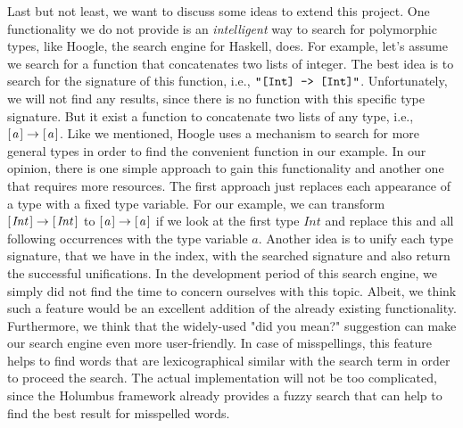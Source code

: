 \documentclass[%
	latex,%
	a4paper,%
	oneside,%
	chapterprefix,%
	headsepline,%
	12pt%
]{scrbook}
\newcommand{\Conid}[1]{\mathit{#1}}
\newcommand{\Varid}[1]{\mathit{#1}}
\begin{document}
Last but not least, we want to discuss some ideas to extend this
project. %
One functionality we do not provide is an \emph{intelligent} way to
search for polymorphic types, like Hoogle, the search engine for
Haskell, does. %
For example, let's assume we search for a function that concatenates
two lists of integer. %
The best idea is to search for the signature of this function, i.e.,
\ensuremath{\text{\tt \char34 [Int]~->~[Int]\char34}}. %
Unfortunately, we will not find any results, since there is no
function with this specific type signature. %
But it exist a function to concatenate two lists of any type, i.e.,
\ensuremath{[\mskip1.5mu \Varid{a}\mskip1.5mu]\to [\mskip1.5mu \Varid{a}\mskip1.5mu]}. %
Like we mentioned, Hoogle uses a mechanism to search for more general
types in order to find the convenient function in our example. %
In our opinion, there is one simple approach to gain this
functionality and another one that requires more resources. %
The first approach just replaces each appearance of a type with a
fixed type variable. %
For our example, we can transform \ensuremath{[\mskip1.5mu \Conid{Int}\mskip1.5mu]\to [\mskip1.5mu \Conid{Int}\mskip1.5mu]} to \ensuremath{[\mskip1.5mu \Varid{a}\mskip1.5mu]\to [\mskip1.5mu \Varid{a}\mskip1.5mu]} if
we look at the first type \ensuremath{\Conid{Int}} and replace this and all following
occurrences with the type variable \ensuremath{\Varid{a}}. %
Another idea is to unify each type signature, that we have in the
index, with the searched signature and also return the successful
unifications. %
In the development period of this search engine, we simply did not
find the time to concern ourselves with this topic. %
Albeit, we think such a feature would be an excellent addition of the
already existing functionality. \\ %

Furthermore, we think that the widely-used "did you mean?" suggestion
can make our search engine even more user-friendly. %
In case of misspellings, this feature helps to find words that are
lexicographical similar with the search term in order to proceed the
search. %
The actual implementation will not be too complicated, since the
Holumbus framework already provides a fuzzy search that can help to
find the best result for misspelled words. \\ %
\end{document}
